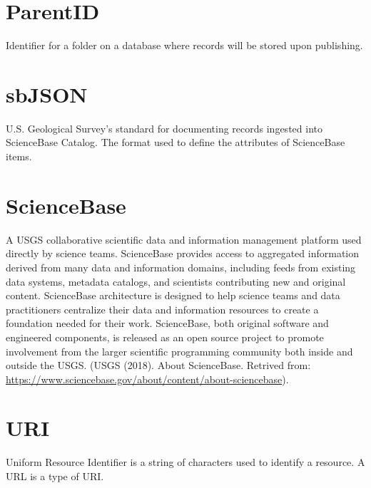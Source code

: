 \documentclass[
]{book}
\begin{document}
\hypertarget{parentid}{%
\section{ParentID}\label{parentid}}

Identifier for a folder on a database where records will be stored upon publishing.

\hypertarget{sbjson}{%
\section{sbJSON}\label{sbjson}}

U.S. Geological Survey's standard for documenting records ingested into ScienceBase Catalog. The format used to define the attributes of ScienceBase items.

\hypertarget{sciencebase}{%
\section{ScienceBase}\label{sciencebase}}

A USGS collaborative scientific data and information management platform used directly by science teams. ScienceBase provides access to aggregated information derived from many data and information domains, including feeds from existing data systems, metadata catalogs, and scientists contributing new and original content. ScienceBase architecture is designed to help science teams and data practitioners centralize their data and information resources to create a foundation needed for their work. ScienceBase, both original software and engineered components, is released as an open source project to promote involvement from the larger scientific programming community both inside and outside the USGS. (USGS (2018). About ScienceBase. Retrived from: \url{https://www.sciencebase.gov/about/content/about-sciencebase}).

\hypertarget{uri}{%
\section{URI}\label{uri}}

Uniform Resource Identifier is a string of characters used to identify a resource. A URL is a type of URI.

  

\printindex
\backmatter
\end{document}
